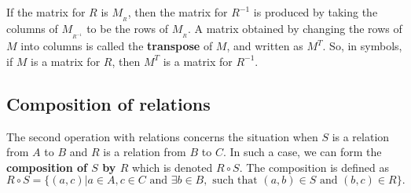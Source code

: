 If the matrix for $R$ is $M_{_R}$, then the matrix for $R^{-1}$ is produced
by taking the columns of $M_{_{R^{-1}}}$ to be the rows of $M_{_R}$. A matrix
obtained by changing the rows of $M$ into columns is called the 
{\bfseries transpose} of $M$, and written as $M^T$. So, in symbols, 
if $M$ is a matrix for $R$, then $M^T$ is a matrix for $R^{-1}$.

\subsection{Composition of relations}
The second operation with relations concerns the situation when 
$S$ is a relation from $A$ to $B$ and $R$ is a relation from $B$ to $C$.
In such a case, we can form the {\bfseries composition of $S$ by $R$} 
which is denoted
$R\circ S$. The composition is defined as
$$R\circ S=\{(a,c)|a\in A, c\in C \text{ and } \exists b\in B, \text{ such that } 
(a,b)\in S \text{ and } (b,c)\in R\}.$$

